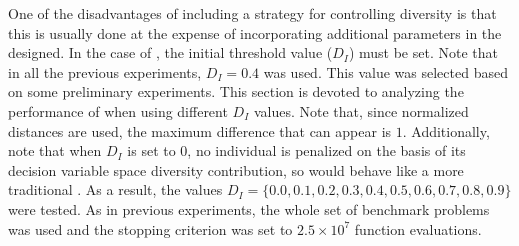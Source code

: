 One of the disadvantages of including a strategy for controlling diversity is that this is usually done at the expense of
incorporating additional parameters in the \EA{} designed.
%
In the case of \VSDMOEA{}, the initial threshold value ($D_I$) must be set.
%
Note that in all the previous experiments, $D_I = 0.4$ was used.
%
This value was selected based on some preliminary experiments.
%
This section is devoted to analyzing the performance of \VSDMOEA{} when using different $D_I$ values. 
%
Note that, since normalized distances are used, the maximum difference that can appear is $1$.
%
Additionally, note that when $D_I$ is set to 0, no individual is penalized on the basis of its decision
variable space diversity contribution,
so \VSDMOEA{} would behave like a more traditional \MOEA{}.
%
As a result, the values $D_I = \{0.0, 0.1, 0.2, 0.3, 0.4, 0.5, 0.6, 0.7, 0.8, 0.9\}$ were tested.
%
As in previous experiments, the whole set of benchmark problems was used and
the stopping criterion was set to $2.5 \times 10^7$ function evaluations.

